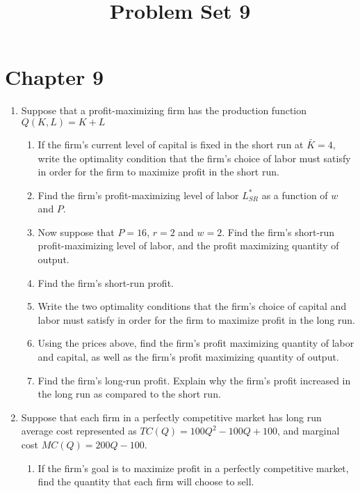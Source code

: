 \documentclass[11pt]{article}
\title{Problem Set 9}
\begin{document}
  
\section*{Chapter 9}

\begin{enumerate}
  \item Suppose that a profit-maximizing firm has the production function $Q(K, L) = K + L$
  \begin{enumerate}
    \item If the firm’s current level of capital is fixed in the short run at $\bar{K} = 4$, write the optimality condition that the firm’s choice of labor must satisfy in order for the firm to maximize profit in the short run.
    
    \item Find the firm’s profit-maximizing level of labor $L^*_{SR}$ as a function of $w$ and $P$.

    \item Now suppose that $P = 16$, $r = 2$ and $w = 2$. Find the firm’s short-run profit-maximizing level of labor, and the profit maximizing quantity of output.
    
    \item Find the firm’s short-run profit.
    
    \item Write the two optimality conditions that the firm’s choice of capital and labor must satisfy in order for the firm to maximize profit in the long run.
    
    \item Using the prices above, find the firm’s profit maximizing quantity of labor and capital, as well as the firm’s profit maximizing quantity of output.
    
    \item Find the firm’s long-run profit. Explain why the firm’s profit increased in the long run as compared to the short run.
  \end{enumerate}
  
  \item Suppose that each firm in a perfectly competitive market has long run average cost represented as $TC(Q) = 100Q^2 - 100Q + 100$, and marginal cost $MC(Q) = 200Q - 100$.
  \begin{enumerate}
    \item If the firm's goal is to maximize profit in a perfectly competitive market, find the quantity that each firm will choose to sell.


\end{enumerate}
\end{enumerate}
\end{document}
